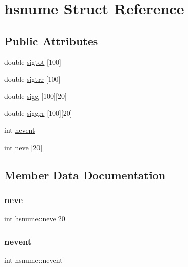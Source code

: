 \hypertarget{structhsnume}{}\section{hsnume Struct Reference}
\label{structhsnume}
\subsection*{Public Attributes}
\begin{DoxyCompactItemize}
\item 
double \hyperlink{structhsnume_ad83b273fb9a02cf1faf3031d209e0ce1}{sigtot} \mbox{[}100\mbox{]}
\item 
double \hyperlink{structhsnume_a76bc97de817d06e5b6ee2f0bc37ad7dd}{sigtrr} \mbox{[}100\mbox{]}
\item 
double \hyperlink{structhsnume_ac93f70a358747045cf8ad44b4dc8629a}{sigg} \mbox{[}100\mbox{]}\mbox{[}20\mbox{]}
\item 
double \hyperlink{structhsnume_a3ba45f1bca6667dd97aa973c7a93b373}{siggrr} \mbox{[}100\mbox{]}\mbox{[}20\mbox{]}
\item 
int \hyperlink{structhsnume_a77196ea7fadc82a721b7a6ed949cf7aa}{nevent}
\item 
int \hyperlink{structhsnume_a3440b3b417e4b5b2cc4a59ab42eb73eb}{neve} \mbox{[}20\mbox{]}
\end{DoxyCompactItemize}


\subsection{Member Data Documentation}
\mbox{\label{structhsnume_a3440b3b417e4b5b2cc4a59ab42eb73eb}} 
\subsubsection{\texorpdfstring{neve}{neve}}
{\footnotesize\ttfamily int hsnume\+::neve\mbox{[}20\mbox{]}}

\mbox{\label{structhsnume_a77196ea7fadc82a721b7a6ed949cf7aa}} 
\subsubsection{\texorpdfstring{nevent}{nevent}}
{\footnotesize\ttfamily int hsnume\+::nevent}

